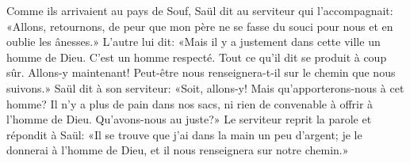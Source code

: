 Comme ils arrivaient au pays de Souf, Saül dit au serviteur qui l’accompagnait:
	«Allons, retournons, de peur que mon père ne se fasse du souci pour nous
		et en oublie les ânesses.»
L’autre lui dit: «Mais il y a justement dans cette ville un homme de Dieu.
	C’est un homme respecté.
	Tout ce qu’il dit se produit à coup sûr.
	Allons-y maintenant!
	Peut-être nous renseignera-t-il sur le chemin que nous suivons.»
Saül dit à son serviteur: «Soit, allons-y!
	Mais qu’apporterons-nous à cet homme?
	Il n’y a plus de pain dans nos sacs,
	ni rien de convenable à offrir à l’homme de Dieu.
	Qu’avons-nous au juste?»
Le serviteur reprit la parole et répondit à Saül:
	«Il se trouve que j’ai dans la main un peu d’argent;
	je le donnerai à l’homme de Dieu, et il nous renseignera sur notre chemin.»
